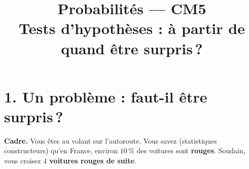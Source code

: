 
\usepackage{tikz}
\usepackage{needspace}

\newcommand{\atrou}[2][3cm]{%
  \ifthenelse{\boolean{showSolutions}}{%
    \par\vspace{0.5em}%
    \begin{mdframed}[backgroundcolor=ThemeLight, linewidth=0pt,
      skipabove=0pt, skipbelow=0pt,
      innertopmargin=8pt, innerbottommargin=8pt]%
    #2%
    \end{mdframed}%
    \par\vspace{0.5em}%
  }{%
    \par\vspace{0.5em}%
    \noindent\fbox{\begin{minipage}[c][#1]%
      {\dimexpr\textwidth-2\fboxsep-2\fboxrule\relax}%
      \color{white}\rule{0pt}{0pt}%
    \end{minipage}}%
    \par\vspace{0.5em}%
  }%
}

\newcommand{\val}[1]{%
  \ifthenelse{\boolean{showSolutions}}{#1}{\phantom{#1}}%
}

\newcommand{\R}{\mathbb{R}}
\newcommand{\E}{\mathbb{E}}
\newcommand{\Var}{\operatorname{Var}}
\newcommand{\Xbar}{\overline{X}_n}

\title{\sffamily\bfseries Probabilités --- CM5\\[0.3em]
  \Large Tests d'hypothèses : à partir de quand être surpris\,?}
\author{}
\date{}


\sffamily
\maketitle
\thispagestyle{empty}

\section*{1. Un problème : faut-il être surpris\,?}

\textbf{Cadre.} Vous êtes au volant sur l'autoroute. Vous savez (statistiques constructeurs) qu'en France, environ $10\,\%$ des voitures sont \textbf{rouges}. Soudain, vous croisez \textbf{$4$ voitures rouges de suite}.

